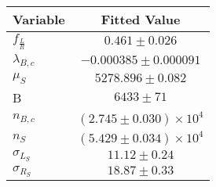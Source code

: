 \begin{tabular}[t]{lc}
\hline
Variable &Fitted Value\\
\hline\hline
$f_{\frac{L}{R}}$&$0.461\pm0.026$\\
\hline
$\lambda_{B,c}$&$-0.000385\pm0.000091$\\
\hline
$\mu_S$&$5278.896\pm0.082$\\
\hline
B&$6433\pm71$\\
\hline
$n_{B,c}$&$(2.745\pm0.030)\times 10^4$\\
\hline
$n_S$&$(5.429\pm0.034)\times 10^4$\\
\hline
$\sigma_{L_S}$&$11.12\pm0.24$\\
\hline
$\sigma_{R_S}$&$18.87\pm0.33$\\
\hline
\end{tabular}